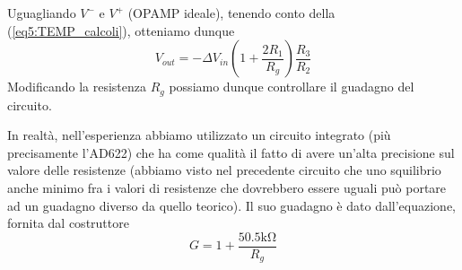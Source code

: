 Uguagliando $V^-$ e $V^+$ (OPAMP ideale), tenendo conto della (\ref{eq5:TEMP_calcoli}), otteniamo dunque
$$V_{out}=-\Delta V_{in} \left(1+\frac{2R_1}{R_g}\right)\frac{R_3}{R_2}$$
Modificando la resistenza $R_g$ possiamo dunque controllare il guadagno del circuito.

In realtà, nell'esperienza abbiamo utilizzato un circuito integrato (più precisamente l'AD622) che ha come qualità il fatto di avere un'alta precisione sul valore delle resistenze (abbiamo visto nel precedente circuito che uno squilibrio anche minimo fra i valori di resistenze che dovrebbero essere uguali può portare ad un guadagno diverso da quello teorico). Il suo guadagno è dato dall'equazione, fornita dal costruttore
$$G=1+\frac{50.5 \si{\kilo\ohm}}{R_g}$$